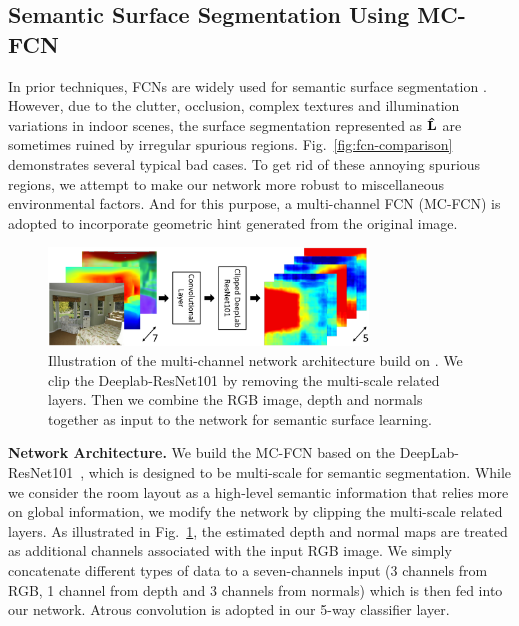 \subsection{Semantic Surface Segmentation Using MC-FCN}
\label{sec:surfacelabel}
In prior techniques, FCNs are widely used for semantic surface segmentation \cite{dasgupta2016delay,ren2016coarse,mallya2015learning}. 
%
However, due to the clutter, occlusion, complex textures and illumination variations in indoor scenes, the surface segmentation represented as $\mathbf{\hat{L}}$ are sometimes ruined by irregular spurious regions. 
Fig.~\ref{fig:fcn-comparison} demonstrates several typical bad cases.
%
To get rid of these annoying spurious regions, we attempt to make our network more robust to miscellaneous environmental factors. 
And for this purpose, a multi-channel FCN (MC-FCN) is adopted to incorporate geometric hint generated from the original image. 
%


\begin{figure}
	\centering
	\includegraphics[width=8.5cm]{figure/MC-FCN.png}
	\caption{Illustration of the multi-channel network architecture build on \cite{chen2016deeplab}. We clip the Deeplab-ResNet101 by removing the multi-scale related layers. Then we combine the RGB image, depth and normals together as input to the network for semantic surface learning. }
	\label{fig:fcn-multi-channel}
\end{figure}


\noindent\textbf{Network Architecture.}
We build the MC-FCN based on the DeepLab-ResNet101~\cite{chen2016deeplab}, which is designed to be multi-scale for semantic segmentation. 
%
While we consider the room layout as a high-level semantic information that relies more on global information, we modify the network by clipping the multi-scale related layers. 
As illustrated in Fig.~\ref{fig:fcn-multi-channel}, the estimated depth and normal maps are treated as additional channels associated with the input RGB image. 
We simply concatenate different types of data to a seven-channels input (3 channels from RGB, 1 channel from depth and 3 channels from normals) which is then fed into our network. Atrous convolution is adopted in our 5-way classifier layer.

